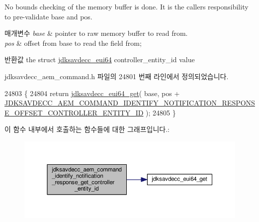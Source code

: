 No bounds checking of the memory buffer is done. It is the caller\textquotesingle{}s responsibility to pre-\/validate base and pos.


\begin{DoxyParams}{매개변수}
{\em base} & pointer to raw memory buffer to read from. \\
\hline
{\em pos} & offset from base to read the field from; \\
\hline
\end{DoxyParams}
\begin{DoxyReturn}{반환값}
the struct \hyperlink{structjdksavdecc__eui64}{jdksavdecc\+\_\+eui64} controller\+\_\+entity\+\_\+id value 
\end{DoxyReturn}


jdksavdecc\+\_\+aem\+\_\+command.\+h 파일의 24801 번째 라인에서 정의되었습니다.


\begin{DoxyCode}
24803 \{
24804     \textcolor{keywordflow}{return} \hyperlink{group__eui64_ga2652311a25a6b91cddbed75c108c7031}{jdksavdecc\_eui64\_get}( base, pos + 
      \hyperlink{group__command__identify__notification_ga6c8e9f2563f4efa1d1859ef904ea7130}{JDKSAVDECC\_AEM\_COMMAND\_IDENTIFY\_NOTIFICATION\_RESPONSE\_OFFSET\_CONTROLLER\_ENTITY\_ID}
       );
24805 \}
\end{DoxyCode}


이 함수 내부에서 호출하는 함수들에 대한 그래프입니다.\+:
\nopagebreak
\begin{figure}[H]
\begin{center}
\leavevmode
\includegraphics[width=350pt]{group__command__identify__notification_ga39610c039df1babe11aaf24ee616791d_cgraph}
\end{center}
\end{figure}


